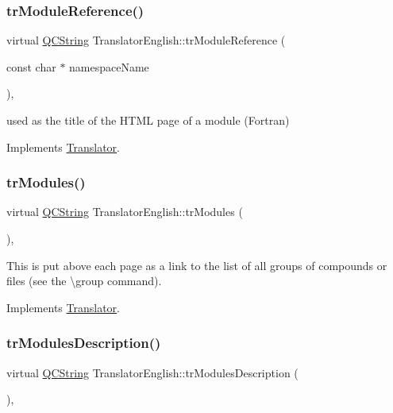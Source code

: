 \subsubsection{\texorpdfstring{trModuleReference()}{trModuleReference()}}
{\footnotesize\ttfamily virtual \mbox{\hyperlink{class_q_c_string}{Q\+C\+String}} Translator\+English\+::tr\+Module\+Reference (\begin{DoxyParamCaption}\item[{const char $\ast$}]{namespace\+Name }\end{DoxyParamCaption})\hspace{0.3cm}{\ttfamily [inline]}, {\ttfamily [virtual]}}

used as the title of the H\+T\+ML page of a module (Fortran) 

Implements \mbox{\hyperlink{class_translator}{Translator}}.

\mbox{\label{class_translator_english_a5ce5d21a6ebb9f9fbac3acb3ab3fc747}} 
\subsubsection{\texorpdfstring{trModules()}{trModules()}}
{\footnotesize\ttfamily virtual \mbox{\hyperlink{class_q_c_string}{Q\+C\+String}} Translator\+English\+::tr\+Modules (\begin{DoxyParamCaption}{ }\end{DoxyParamCaption})\hspace{0.3cm}{\ttfamily [inline]}, {\ttfamily [virtual]}}

This is put above each page as a link to the list of all groups of compounds or files (see the \textbackslash{}group command). 

Implements \mbox{\hyperlink{class_translator}{Translator}}.

\mbox{\label{class_translator_english_ab9bc72301c7b0af903b66d379f5b7537}} 
\subsubsection{\texorpdfstring{trModulesDescription()}{trModulesDescription()}}
{\footnotesize\ttfamily virtual \mbox{\hyperlink{class_q_c_string}{Q\+C\+String}} Translator\+English\+::tr\+Modules\+Description (\begin{DoxyParamCaption}{ }\end{DoxyParamCaption})\hspace{0.3cm}{\ttfamily [inline]}, {\ttfamily [virtual]}}

